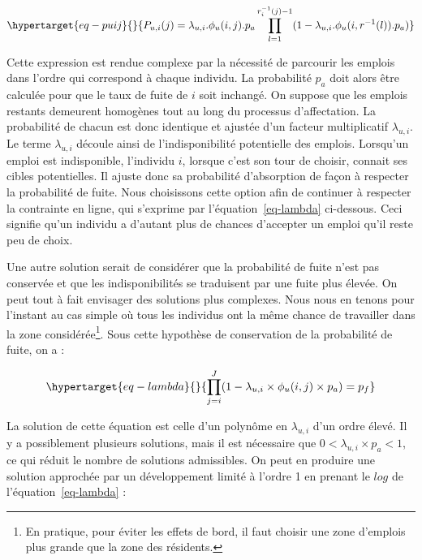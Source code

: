 \documentclass[
  10pt,
  a4paper,
  numbers=noendperiod,
  DIV=9]{scrreprt}
\begin{document}
\begin{equation}\protect\hypertarget{eq-puij}{}{
P_{u, i}(j) = \lambda_{u,i}.\phi_u(i,j). p_a \prod_{l=1}^{r_i^{-1}(j)-1}(1-\lambda_{u,i}. \phi_u(i,r^{-1}(l)).p_a)
}\label{eq-puij}\end{equation}

Cette expression est rendue complexe par la nécessité de parcourir les
emplois dans l'ordre qui correspond à chaque individu. La probabilité
\(p_a\) doit alors être calculée pour que le taux de fuite de \(i\) soit
inchangé. On suppose que les emplois restants demeurent homogènes tout
au long du processus d'affectation. La probabilité de chacun est donc
identique et ajustée d'un facteur multiplicatif \(\lambda_{u,i}\). Le
terme \(\lambda_{u,i}\) découle ainsi de l'indisponibilité potentielle
des emplois. Lorsqu'un emploi est indisponible, l'individu \(i\),
lorsque c'est son tour de choisir, connait ses cibles potentielles. Il
ajuste donc sa probabilité d'absorption de façon à respecter la
probabilité de fuite. Nous choisissons cette option afin de continuer à
respecter la contrainte en ligne, qui s'exprime par
l'équation~\ref{eq-lambda} ci-dessous. Ceci signifie qu'un individu a
d'autant plus de chances d'accepter un emploi qu'il reste peu de choix.

Une autre solution serait de considérer que la probabilité de fuite
n'est pas conservée et que les indisponibilités se traduisent par une
fuite plus élevée. On peut tout à fait envisager des solutions plus
complexes. Nous nous en tenons pour l'instant au cas simple où tous les
individus ont la même chance de travailler dans la zone
considérée\footnote{En pratique, pour éviter les effets de bord, il faut
  choisir une zone d'emplois plus grande que la zone des résidents.}.
Sous cette hypothèse de conservation de la probabilité de fuite, on a :

\begin{equation}\protect\hypertarget{eq-lambda}{}{
\prod_{j=i} ^{J} (1-\lambda_{u,i} \times \phi_u(i,j) \times p_{a})= p_f
}\label{eq-lambda}\end{equation}

La solution de cette équation est celle d'un polynôme en
\(\lambda_{u,i}\) d'un ordre élevé. Il y a possiblement plusieurs
solutions, mais il est nécessaire que \(0<\lambda_{u,i}\times p_a<1\),
ce qui réduit le nombre de solutions admissibles. On peut en produire
une solution approchée par un développement limité à l'ordre 1 en
prenant le \(log\) de l'équation~\ref{eq-lambda} :
\end{document}
